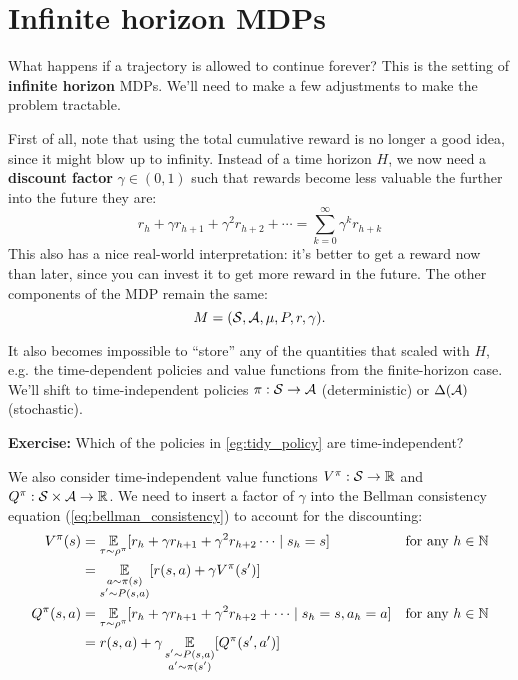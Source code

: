 \documentclass[../main/main]{subfiles}
\begin{document}
\newpage

\section{Infinite horizon MDPs}

What happens if a trajectory is allowed to continue forever? This is the setting of \textbf{infinite horizon} MDPs. We'll need to make a few adjustments to make the problem tractable.

First of all, note that using the total cumulative reward is no longer a good idea, since it might blow up to infinity. Instead of a time horizon $H$, we now need a \textbf{discount factor} $\gamma \in (0, 1)$ such that rewards become less valuable the further into the future they are:
\[
    r_h + \gamma r_{h+1} + \gamma^2 r_{h+2} + \cdots = \sum_{k=0}^\infty \gamma^k r_{h+k}
\]
This also has a nice real-world interpretation: it's better to get a reward now than later, since you can invest it to get more reward in the future. The other components of the MDP remain the same:
\[ M = (\mathcal{S}, \mathcal{A}, \mu, P, r, \gamma). \]

It also becomes impossible to ``store'' any of the quantities that scaled with $H$, e.g. the time-dependent policies and value functions from the finite-horizon case. We'll shift to time-independent policies $\pi : \mathcal{S} \to \mathcal{A}$ (deterministic) or $\Delta(\mathcal{A})$ (stochastic).

\textbf{Exercise:} Which of the policies in \ref{eg:tidy_policy} are time-independent?

We also consider time-independent value functions $V^\pi : \mathcal{S} \to \mathbb{R}$ and $Q^\pi : \mathcal{S} \times \mathcal{A} \to \mathbb{R}$. We need to insert a factor of $\gamma$ into the Bellman consistency equation (\ref{eq:bellman_consistency}) to account for the discounting:
\begin{equation}
\begin{aligned}
    V^\pi(s) &= \operatorname*{\mathbb{E}}_{\tau \sim \rho^\pi} [r_h + \gamma r_{h+1} + \gamma^2 r_{h+2} \cdots \mid s_h = s] && \text{for any } h \in \mathbb{N} \\
    &= \operatorname*{\mathbb{E}}_{\substack{a \sim \pi(s) \\ s' \sim P(s, a)}} [r(s, a) + \gamma V^\pi(s')]\\
    Q^\pi(s, a) &= \operatorname*{\mathbb{E}}_{\tau \sim \rho^\pi} [r_h + \gamma r_{h+1} + \gamma^2 r_{h+2} + \cdots \mid s_h = s, a_h = a] && \text{for any } h \in \mathbb{N} \\
    &= r(s, a) + \gamma \operatorname*{\mathbb{E}}_{\substack{s' \sim P(s, a) \\ a' \sim \pi(s')}} [Q^\pi(s', a')]
\end{aligned}
\label{eq:bellman_consistency_infinite}
\end{equation}
\end{document}
